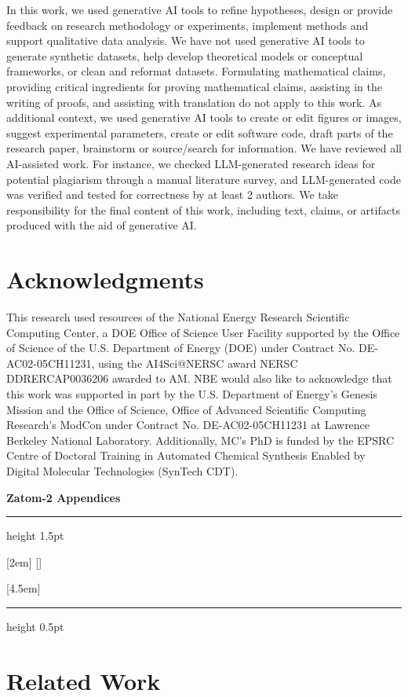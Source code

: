 \documentclass{article} %
\newcommand{\appendixtoc}{
  \clearpage
  \startcontents[appendix]

  \begin{center}
    {\huge\bfseries Zatom-2 Appendices}
    \vspace{8pt}
    \hrule height 1.5pt
    \vspace{16pt}
  \end{center}

  \titlecontents{section}[2em]
    {\addvspace{12pt}\bfseries\sffamily\large}
    {\contentslabel{2em}}
    {}
    {\titlerule*[0.6pc]{.}\contentspage}
    [\addvspace{2pt}]

  \titlecontents{subsection}[4.5em]
    {\addvspace{2pt}\sffamily\small}
    {\contentslabel{2.5em}}
    {}
    {\titlerule*[0.6pc]{.}\contentspage}

  \printcontents[appendix]{}{1}{\setcounter{tocdepth}{2}}

  \vspace{24pt}
  \hrule height 0.5pt
}
\begin{document}
In this work, we used generative AI tools to refine hypotheses, design or provide feedback on research methodology or experiments, implement methods and support qualitative data analysis. We have not used generative AI tools to generate synthetic datasets, help develop theoretical models or conceptual frameworks, or clean and reformat datasets. Formulating mathematical claims, providing critical ingredients for proving mathematical claims, assisting in the writing of proofs, and assisting with translation do not apply to this work. As additional context, we used generative AI tools to create or edit figures or images, suggest experimental parameters, create or edit software code, draft parts of the research paper, brainstorm or source/search for information. We have reviewed all AI-assisted work. For instance, we checked LLM-generated research ideas for potential plagiarism through a manual literature survey, and LLM-generated code was verified and tested for correctness by at least 2 authors. We take responsibility for the final content of this work, including text, claims, or artifacts produced with the aid of generative AI.

\section{Acknowledgments}
This research used resources of the National Energy Research Scientific Computing Center, a DOE Office of Science User Facility supported by the Office of Science of the U.S. Department of Energy (DOE) under Contract No. DE-AC02-05CH11231, using the AI4Sci@NERSC award NERSC DDRERCAP0036206 awarded to AM. NBE would also like to acknowledge that this work was supported in part by the U.S. Department of Energy's Genesis Mission and the Office of Science, Office of Advanced Scientific Computing Research's ModCon under Contract No. DE-AC02-05CH11231 at Lawrence Berkeley National Laboratory. Additionally, MC's PhD is funded by the EPSRC Centre of Doctoral Training in Automated Chemical Synthesis Enabled by Digital Molecular Technologies (SynTech CDT).


\clearpage



\appendix
\appendixtoc
\clearpage

\section{Related Work}
\label{app:related-work}
\end{document}
